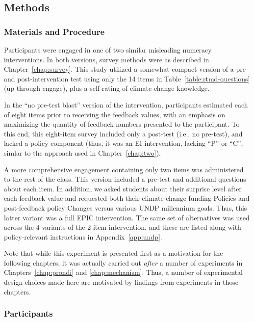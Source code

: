 \subsection{Methods} 
\label{sec:evilndi-methods}

\subsubsection{Materials and Procedure}

Participants were engaged in one of two similar misleading numeracy
interventions. In both versions, survey methods were as described in
Chapter~\ref{chap:survey}. This study utilized a somewhat compact version of a
pre- and post-intervention test using only the 14 items in
Table~\ref{table:rtmd-questions} (up through \textsf{engage}), plus a
self-rating of climate-change knowledge.  

In the “no pre-test blast” version of the intervention, participants estimated
each of eight items prior to receiving the feedback values, with an emphasis on
maximizing the quantity of feedback numbers presented to the participant. To
this end, this eight-item survey included only a post-test (i.e., no pre-test),
and lacked a policy component (thus, it was an EI intervention, lacking ``P'' or
``C'', simlar to the approach used in Chapter~\ref{chap:two}). 

A more comprehensive engagement containing only two items was administered to
the rest of the class. This version included a pre-test and additional questions
about each item. In addition, we asked students about their surprise level after
each feedback value and requested both their climate-change funding Policies and
post-feedback policy Changes versus various UNDP millennium goals.  Thus, this
latter variant was a full EPIC intervention. The same set of alternatives was
used across the 4 variants of the 2-item intervention, and these are listed
along with policy-relevant instructions in Appendix~\ref{app:undp}.

Note that while this experiment is presented first as a motivation for the
following chapters, it was actually carried out \emph{after} a number of
experiments in Chapters~\ref{chap:prondi} and \ref{chap:mechanism}. Thus, a
number of experimental design choices made here are motivated by findings from
experiments in those chapters.

\subsubsection{Participants}

